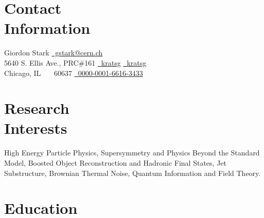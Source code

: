\documentclass[margin,line]{resume}
\let\origsection\section%
\let\section\subsection%
\let\section\origsection%
\begin{document}
\begin{resume}

\section{\mysidestyle Contact\\Information}

Giordon Stark                 \hfill \href{mailto:gstark@cern.ch}{~gstark@cern.ch}
\vspace{0mm}\\\vspace{0mm}%
5640 S. Ellis Ave., PRC\#161  \hfill \href{https://github.com/kratsg}{~kratsg} {\large\rmfamily\textbullet} \href{https://twitter.com/kratsg}{~kratsg}
\vspace{0mm}\\\vspace{0mm}%
Chicago, IL \ \ \ 60637       \hfill \href{https://orcid.org/0000-0001-6616-3433}{~0000-0001-6616-3433} \\
\vspace{-4.5mm}%

\section{\mysidestyle Research\\Interests}

High Energy Particle Physics, Supersymmetry and Physics Beyond the Standard
Model, Boosted Object Reconstruction and Hadronic Final States, Jet
Substructure, Brownian Thermal Noise, Quantum Information and Field Theory.

\section{\mysidestyle Education}


\end{resume}
\end{document}
